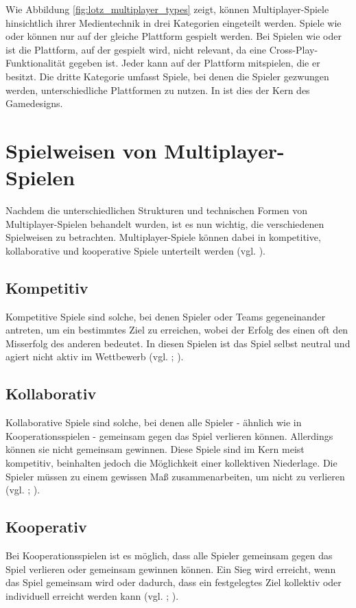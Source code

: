 Wie Abbildung \ref{fig:lotz_multiplayer_types} zeigt, können Multiplayer-Spiele hinsichtlich ihrer Medientechnik in drei Kategorien eingeteilt werden.
Spiele wie  oder  können nur auf der gleiche Plattform gespielt werden. Bei Spielen wie  oder  ist die Plattform, auf der gespielt wird, nicht relevant, da eine Cross-Play-Funktionalität gegeben ist. Jeder kann auf der Plattform mitspielen, die er besitzt. Die dritte Kategorie umfasst Spiele, bei denen die Spieler gezwungen werden, unterschiedliche Plattformen zu nutzen. In  ist dies der Kern des Gamedesigns.

\section{Spielweisen von Multiplayer-Spielen}
Nachdem die unterschiedlichen Strukturen und technischen Formen von Multiplayer-Spielen behandelt wurden, ist es nun wichtig, die verschiedenen Spielweisen zu betrachten. Multiplayer-Spiele können dabei in kompetitive, kollaborative und kooperative Spiele unterteilt werden (vgl. \citealp[S. 25f]{p_zagal_collaborative_2006}).

\subsection{Kompetitiv}
Kompetitive Spiele sind solche, bei denen Spieler oder Teams gegeneinander antreten, um ein bestimmtes Ziel zu erreichen, wobei der Erfolg des einen oft den Misserfolg des anderen bedeutet. In diesen Spielen ist das Spiel selbst neutral und agiert nicht aktiv im Wettbewerb (vgl. \citealp{kiley_game_2014}; \citealp[S. 25]{p_zagal_collaborative_2006}).

\subsection{Kollaborativ}
Kollaborative Spiele sind solche, bei denen alle Spieler - ähnlich wie in Kooperationsspielen - gemeinsam gegen das Spiel verlieren können. Allerdings können sie nicht gemeinsam gewinnen. Diese Spiele sind im Kern meist kompetitiv, beinhalten jedoch die Möglichkeit einer kollektiven Niederlage. Die Spieler müssen zu einem gewissen Maß zusammenarbeiten, um nicht zu verlieren (vgl. \citealp{kiley_game_2014};  \citealp[S. 25]{p_zagal_collaborative_2006}).

\subsection{Kooperativ}
Bei Kooperationsspielen ist es möglich, dass alle Spieler gemeinsam gegen das Spiel verlieren oder gemeinsam gewinnen können. Ein Sieg wird erreicht, wenn das Spiel gemeinsam  wird oder dadurch, dass ein festgelegtes Ziel kollektiv oder individuell erreicht werden kann (vgl. \citealp{kiley_game_2014}; \citealp[S. 25]{p_zagal_collaborative_2006}).

